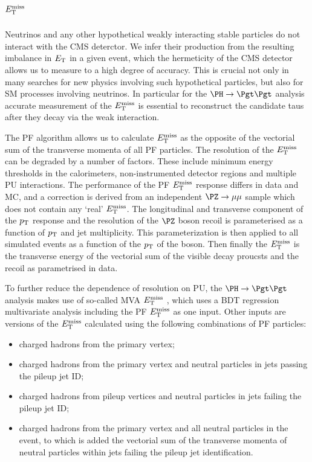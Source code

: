 \section{$E_{\mathrm{T}}^{\text{miss}}$}
\label{sec:met}

Neutrinos and any other hypothetical weakly interacting stable particles do not
interact with the CMS deterctor. We infer their production from the resulting
imbalance in $E_{\mathrm{T}}$ in a given event, which the hermeticity of the CMS detector
allows us to measure to a high degree of accuracy. This is crucial not only in
many searches for new physics involving such hypothetical particles, but also for
\ac{SM} processes involving neutrinos. In particular for the $\PH \to \Pgt\Pgt$
analysis accurate measurement of the $E_{\mathrm{T}}^{\text{miss}}$ is essential to reconstruct the
candidate taus after they decay via the weak interaction.

The \ac{PF} algorithm allows us to calculate $E_{\mathrm{T}}^{\text{miss}}$ as the opposite of the vectorial sum
of the transverse momenta of all \ac{PF} particles. The resolution of the $E_{\mathrm{T}}^{\text{miss}}$
can be degraded by a number of factors. These include minimum energy thresholds
in the calorimeters, non-instrumented detector regions and multiple \ac{PU}
interactions. The performance of the \ac{PF} $E_{\mathrm{T}}^{\text{miss}}$ response differs in data and
MC, and a correction is derived from an independent $\PZ\to\mu\mu$ sample which
does not contain any `real' $E_{\mathrm{T}}^{\text{miss}}$. The longitudinal and transverse component of
the $p_{\mathrm{T}}$ response and the resolution of the $\PZ$ boson recoil is parameterised
as a function of $p_{\mathrm{T}}$ and jet multiplicity. This parameterization is then
applied to all simulated events as a function of the $p_{\mathrm{T}}$ of the boson. Then
finally the $E_{\mathrm{T}}^{\text{miss}}$ is the transverse energy of the vectorial sum of the visible
decay proucsts and the recoil as parametrised in data. 

To further reduce the dependence of resolution on \ac{PU}, the $\PH\to\Pgt\Pgt$
analysis makes use of so-called MVA $E_{\mathrm{T}}^{\text{miss}}$ \cite{CMS-PAS-JME-12-002}, 
which uses a \ac{BDT} regression multivariate analysis
including the \ac{PF} $E_{\mathrm{T}}^{\text{miss}}$ as one input. Other inputs are versions of the
$E_{\mathrm{T}}^{\text{miss}}$ calculated using the following combinations of \ac{PF} particles: 
\begin{itemize}
\item charged hadrons from the primary vertex;
\item charged hadrons from the primary vertex and neutral particles in jets
passing the pileup jet ID;
\item charged hadrons from pileup vertices and neutral particles in jets failing
the pileup jet ID;
\item charged hadrons from the primary vertex and all neutral particles in the
event, to which is added the vectorial sum of the transverse momenta of neutral
particles within jets failing the pileup jet identification.
\end{itemize}

